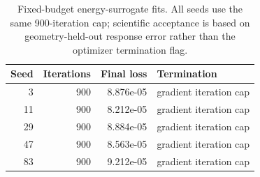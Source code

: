 \begin{table}[t]
\centering\small
\caption{Fixed-budget energy-surrogate fits. All seeds use the same 900-iteration cap; scientific acceptance is based on geometry-held-out response error rather than the optimizer termination flag.}
\label{tab:energy_training}
\begin{tabular}{rrrl}
\toprule
Seed & Iterations & Final loss & Termination \\
\midrule
3 & 900 & 8.876e-05 & gradient iteration cap \\
11 & 900 & 8.212e-05 & gradient iteration cap \\
29 & 900 & 8.884e-05 & gradient iteration cap \\
47 & 900 & 8.563e-05 & gradient iteration cap \\
83 & 900 & 9.212e-05 & gradient iteration cap \\
\bottomrule
\end{tabular}
\end{table}

